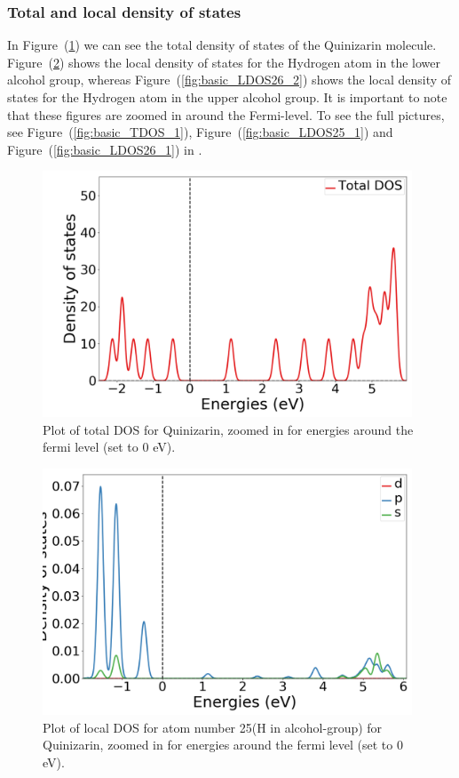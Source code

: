 \documentclass{article}
\begin{document}
      \vspace{1cm}

    \subsubsection{Total and local density of states}

      In Figure~(\ref{fig:basic_TDOS_2}) we can see the total density of states of the Quinizarin molecule. Figure~(\ref{fig:basic_LDOS25_2}) shows the local density of states for the Hydrogen atom in the lower alcohol group, whereas Figure~(\ref{fig:basic_LDOS26_2}) shows the local density of states for the Hydrogen atom in the upper alcohol group. It is important to note that these figures are zoomed in around the Fermi-level.
      To see the full pictures, see Figure~(\ref{fig:basic_TDOS_1}), Figure~(\ref{fig:basic_LDOS25_1}) and Figure~(\ref{fig:basic_LDOS26_1}) in . \\

      \begin{figure}[H]
        \centering
        \includegraphics[width = 11cm]{../fig/basic_TDOS_2.png}
        \caption{Plot of total DOS for Quinizarin, zoomed in for energies around the fermi level (set to 0 eV). }
        \label{fig:basic_TDOS_2}
      \end{figure}

      \begin{figure}[H]
        \centering
        \includegraphics[width = 11cm]{../fig/basic_LDOS25_2.png}
        \caption{Plot of local DOS for atom number 25(H in alcohol-group) for Quinizarin, zoomed in for energies around the fermi level (set to 0 eV). }
        \label{fig:basic_LDOS25_2}
      \end{figure}
\end{document}
